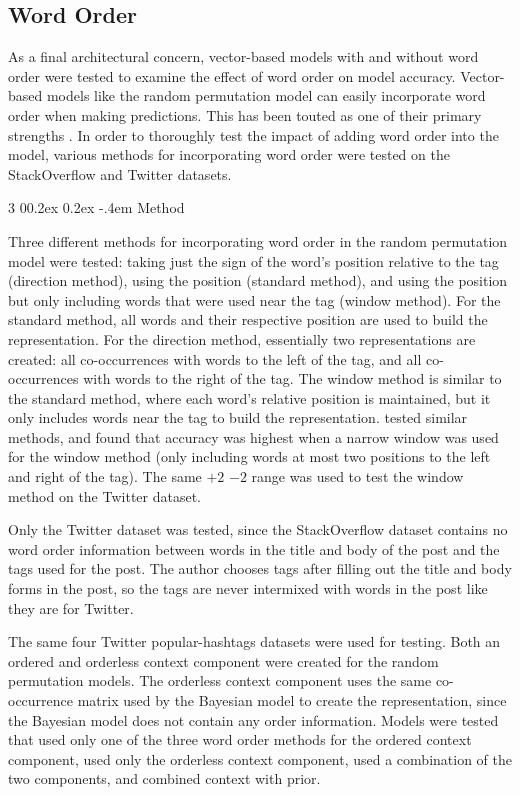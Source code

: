 \documentclass[man,floatsintext,donotrepeattitle]{apa6}
\makeatletter
\renewcommand{\subsubsection}{%
  \@startsection
  {subsubsection}%
  {3}%
  {\parindent}%
  {0\baselineskip \@plus 0.2ex \@minus 0.2ex}%
  {-.4em}%
  {\normalfont\normalsize\bfseries\addperi}}
\makeatother
\begin{document}
\subsection{Word Order}

As a final architectural concern, vector-based models with and without word order were tested to examine the effect of word order on model accuracy.
Vector-based models like the random permutation model can easily incorporate word order when making predictions.
This has been touted as one of their primary strengths \parencites{Jones2007, Sahlgren2008}.
In order to thoroughly test the impact of adding word order into the model, various methods for incorporating word order were tested on the StackOverflow and Twitter datasets.

\subsubsection{Method}

Three different methods for incorporating word order in the random permutation model were tested:
taking just the sign of the word's position relative to the tag (direction method), using the position (standard method), and using the position but only including words that were used near the tag (window method).
For the standard method, all words and their respective position are used to build the representation.
For the direction method, essentially two representations are created: all co-occurrences with words to the left of the tag, and all co-occurrences with words to the right of the tag.
The window method is similar to the standard method, where each word's relative position is maintained, but it only includes words near the tag to build the representation.
\textcite{Sahlgren2008} tested similar methods, and found that accuracy was highest when a narrow window was used for the window method (only including words at most two positions to the left and right of the tag).
The same $+2$ $-2$ range was used to test the window method on the Twitter dataset.

Only the Twitter dataset was tested, since the StackOverflow dataset contains no word order information between words in the title and body of the post and the tags used for the post.
The author chooses tags after filling out the title and body forms in the post, so the tags are never intermixed with words in the post like they are for Twitter.

The same four Twitter popular-hashtags datasets were used for testing.
Both an ordered and orderless context component were created for the random permutation models.
The orderless context component uses the same co-occurrence matrix used by the Bayesian model to create the representation, since the Bayesian model does not contain any order information.
Models were tested that used only one of the three word order methods for the ordered context component, used only the orderless context component, used a combination of the two components, and combined context with prior. 
\end{document}
